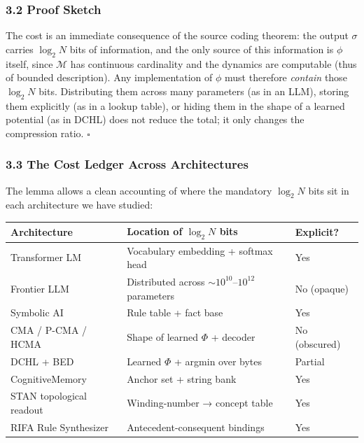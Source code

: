 \documentclass[
  11pt,
  a4paper,
]{article}
\begin{document}
\subsubsection{3.2 Proof Sketch}\label{proof-sketch}

The cost is an immediate consequence of the source coding theorem: the
output \(\sigma\) carries \(\log_2 N\) bits of information, and the only
source of this information is \(\phi\) itself, since \(\mathcal{M}\) has
continuous cardinality and the dynamics are computable (thus of bounded
description). Any implementation of \(\phi\) must therefore
\emph{contain} those \(\log_2 N\) bits. Distributing them across many
parameters (as in an LLM), storing them explicitly (as in a lookup
table), or hiding them in the shape of a learned potential (as in DCHL)
does not reduce the total; it only changes the compression ratio.
\(\square\)

\subsubsection{3.3 The Cost Ledger Across
Architectures}\label{the-cost-ledger-across-architectures}

The lemma allows a clean accounting of where the mandatory \(\log_2 N\)
bits sit in each architecture we have studied:

\begin{longtable}[]{@{}
  >{\raggedright\arraybackslash}p{}
  >{\raggedright\arraybackslash}p{}
  >{\raggedright\arraybackslash}p{}@{}}
\toprule\noalign{}
\begin{minipage}[b]{\linewidth}\raggedright
Architecture
\end{minipage} & \begin{minipage}[b]{\linewidth}\raggedright
Location of \(\log_2 N\) bits
\end{minipage} & \begin{minipage}[b]{\linewidth}\raggedright
Explicit?
\end{minipage} \\
\midrule\noalign{}
\endhead
\bottomrule\noalign{}
\endlastfoot
Transformer LM & Vocabulary embedding + softmax head & Yes \\
Frontier LLM & Distributed across \(\sim 10^{10}\)--\(10^{12}\)
parameters & No (opaque) \\
Symbolic AI & Rule table + fact base & Yes \\
CMA / P-CMA / HCMA & Shape of learned \(\Phi\) + decoder & No
(obscured) \\
DCHL + BED & Learned \(\Phi\) + argmin over bytes & Partial \\
CognitiveMemory & Anchor set + string bank & Yes \\
STAN topological readout & Winding-number → concept table & Yes \\
RIFA Rule Synthesizer & Antecedent-consequent bindings & Yes \\
\end{longtable}
\end{document}
